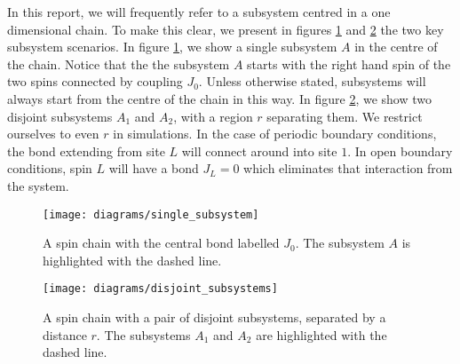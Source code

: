 In this report, we will frequently refer to a subsystem centred in a one dimensional chain. To make this clear, we present in figures \ref{fig:chain_diagram} and \ref{fig:disjoint_diagram} the two key subsystem scenarios. In figure \ref{fig:chain_diagram}, we show a single subsystem $A$ in the centre of the chain. Notice that the the subsystem $A$ starts with the right hand spin of the two spins connected by coupling $J_0$. Unless otherwise stated, subsystems will always start from the centre of the chain in this way. In figure \ref{fig:disjoint_diagram}, we show two disjoint subsystems $A_1$ and $A_2$, with a region $r$ separating them. We restrict ourselves to even $r$ in simulations. In the case of periodic boundary conditions, the bond extending from site $L$ will connect around into site $1$. In open boundary conditions, spin $L$ will have a bond $J_L = 0$ which eliminates that interaction from the system. 
 

\begin{figure}[h]
	\centering
	\texttt{[image: diagrams/single\_subsystem]}	
	\caption{A spin chain with the central bond labelled $J_0$. The subsystem $A$ is highlighted with the dashed line.}
	\label{fig:chain_diagram}
\end{figure}

\begin{figure}[h]
	\centering
	\texttt{[image: diagrams/disjoint\_subsystems]}	
	\caption{A spin chain with a pair of disjoint subsystems, separated by a distance $r$. The subsystems $A_1$ and $A_2$ are highlighted with the dashed line.}
	\label{fig:disjoint_diagram}
\end{figure}



